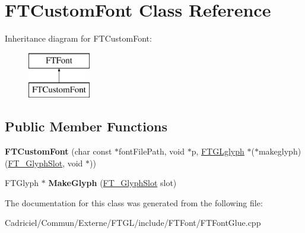 \hypertarget{class_f_t_custom_font}{}\section{F\+T\+Custom\+Font Class Reference}
\label{class_f_t_custom_font}
Inheritance diagram for F\+T\+Custom\+Font\+:\begin{figure}[H]
\begin{center}
\leavevmode
\includegraphics[height=2.000000cm]{class_f_t_custom_font}
\end{center}
\end{figure}
\subsection*{Public Member Functions}
\begin{DoxyCompactItemize}
\item 
{\bfseries F\+T\+Custom\+Font} (char const $\ast$font\+File\+Path, void $\ast$p, \hyperlink{struct___f_t_g_lglyph}{F\+T\+G\+Lglyph} $\ast$($\ast$makeglyph)(\hyperlink{struct_f_t___glyph_slot_rec__}{F\+T\+\_\+\+Glyph\+Slot}, void $\ast$))\hypertarget{class_f_t_custom_font_a752e3adba12661605536402b55381aa8}{}\label{class_f_t_custom_font_a752e3adba12661605536402b55381aa8}

\item 
F\+T\+Glyph $\ast$ {\bfseries Make\+Glyph} (\hyperlink{struct_f_t___glyph_slot_rec__}{F\+T\+\_\+\+Glyph\+Slot} slot)\hypertarget{class_f_t_custom_font_a14863f6c098d220681087ff85f004dff}{}\label{class_f_t_custom_font_a14863f6c098d220681087ff85f004dff}

\end{DoxyCompactItemize}


The documentation for this class was generated from the following file\+:\begin{DoxyCompactItemize}
\item 
Cadriciel/\+Commun/\+Externe/\+F\+T\+G\+L/include/\+F\+T\+Font/F\+T\+Font\+Glue.\+cpp\end{DoxyCompactItemize}

